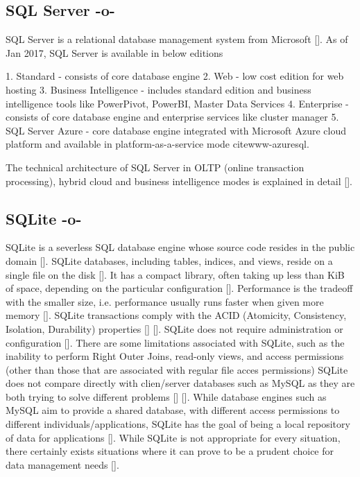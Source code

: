 \subsection{SQL Server -o-}

SQL Server is a relational database management system from
Microsoft [\cite{www-sqlserver-wiki}].  As of Jan 2017, SQL Server is
available in below editions

     1. Standard - consists of core database engine
     2. Web - low cost edition for web hosting
     3. Business Intelligence - includes standard edition and business
        intelligence tools like PowerPivot, PowerBI, Master Data Services
     4. Enterprise - consists of core database engine and enterprise services
        like cluster manager
     5. SQL Server Azure - core database engine
        integrated with Microsoft Azure cloud platform and available in
        platform-as-a-service mode cite{www-azuresql}.

        The technical architecture of SQL Server in OLTP (online
        transaction processing), hybrid cloud and business
        intelligence modes is explained in
        detail [\cite{book-sqlserver}].





\subsection{SQLite -o-}

SQLite is a severless SQL database engine whose source code resides in
the public domain [\cite{sqliteabout}]. SQLite databases, including
tables, indices, and views, reside on a single file on the
disk [\cite{sqliteabout}]. It has a compact library, often taking up
less than KiB of space, depending on the particular
configuration [\cite{sqliteabout}]. Performance is the tradeoff with the
smaller size, i.e. performance usually runs faster when given more
memory [\cite{sqliteabout}]. SQLite transactions comply with the ACID
(Atomicity, Consistency, Isolation, Durability)
properties [\cite{sqliteabout}] [\cite{acid}]. SQLite does not require
administration or configuration [\cite{sqliteover}]. There are some
limitations associated with SQLite, such as the inability to perform
Right Outer Joins, read-only views, and access permissions (other than
those that are associated with regular file acces permissions) SQLite
does not compare directly with clien/server databases such as MySQL as
they are both trying to solve different
problems [\cite{sqlitewhentouse}] [\cite{sqliteover}].  While database
engines such as MySQL aim to provide a shared database, with different
access permissions to different individuals/applications, SQLite has
the goal of being a local repository of data for
applications [\cite{sqlitewhentouse}]. While SQLite is not appropriate
for every situation, there certainly exists situations where it can
prove to be a prudent choice for data management
needs [\cite{sqlitewhentouse}].


